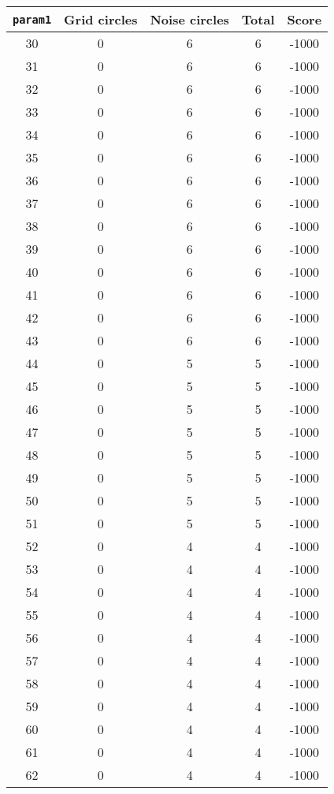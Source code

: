 \documentclass[letterpaper, 12pt]{article}
\begin{document}
\begin{longtable}{|c|c|c|c|c|}
\hline
\textbf{\texttt{param1}} & \textbf{Grid circles} & \textbf{Noise circles} & \textbf{Total} & \textbf{Score} \\
\hline
30 & 0 & 6 & 6 & -1000 \\
\hline
31 & 0 & 6 & 6 & -1000 \\
\hline
32 & 0 & 6 & 6 & -1000 \\
\hline
33 & 0 & 6 & 6 & -1000 \\
\hline
34 & 0 & 6 & 6 & -1000 \\
\hline
35 & 0 & 6 & 6 & -1000 \\
\hline
36 & 0 & 6 & 6 & -1000 \\
\hline
37 & 0 & 6 & 6 & -1000 \\
\hline
38 & 0 & 6 & 6 & -1000 \\
\hline
39 & 0 & 6 & 6 & -1000 \\
\hline
40 & 0 & 6 & 6 & -1000 \\
\hline
41 & 0 & 6 & 6 & -1000 \\
\hline
42 & 0 & 6 & 6 & -1000 \\
\hline
43 & 0 & 6 & 6 & -1000 \\
\hline
44 & 0 & 5 & 5 & -1000 \\
\hline
45 & 0 & 5 & 5 & -1000 \\
\hline
46 & 0 & 5 & 5 & -1000 \\
\hline
47 & 0 & 5 & 5 & -1000 \\
\hline
48 & 0 & 5 & 5 & -1000 \\
\hline
49 & 0 & 5 & 5 & -1000 \\
\hline
50 & 0 & 5 & 5 & -1000 \\
\hline
51 & 0 & 5 & 5 & -1000 \\
\hline
52 & 0 & 4 & 4 & -1000 \\
\hline
53 & 0 & 4 & 4 & -1000 \\
\hline
54 & 0 & 4 & 4 & -1000 \\
\hline
55 & 0 & 4 & 4 & -1000 \\
\hline
56 & 0 & 4 & 4 & -1000 \\
\hline
57 & 0 & 4 & 4 & -1000 \\
\hline
58 & 0 & 4 & 4 & -1000 \\
\hline
59 & 0 & 4 & 4 & -1000 \\
\hline
60 & 0 & 4 & 4 & -1000 \\
\hline
61 & 0 & 4 & 4 & -1000 \\
\hline
62 & 0 & 4 & 4 & -1000 \\

\end{longtable}
\end{document}
